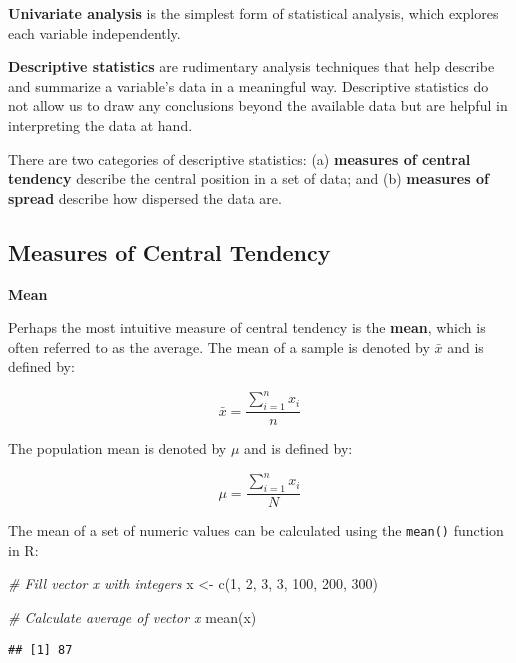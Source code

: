 \documentclass[
]{book}
\newenvironment{Shaded}{\begin{snugshade}}{\end{snugshade}}
\newcommand{\CommentTok}[1]{\textcolor[rgb]{0.56,0.35,0.01}{\textit{#1}}}
\newcommand{\DecValTok}[1]{\textcolor[rgb]{0.00,0.00,0.81}{#1}}
\newcommand{\FunctionTok}[1]{\textcolor[rgb]{0.00,0.00,0.00}{#1}}
\newcommand{\NormalTok}[1]{#1}
\newcommand{\OtherTok}[1]{\textcolor[rgb]{0.56,0.35,0.01}{#1}}
\begin{document}
\textbf{Univariate analysis} is the simplest form of statistical analysis, which explores each variable independently.

\textbf{Descriptive statistics} are rudimentary analysis techniques that help describe and summarize a variable's data in a meaningful way. Descriptive statistics do not allow us to draw any conclusions beyond the available data but are helpful in interpreting the data at hand.

There are two categories of descriptive statistics: (a) \textbf{measures of central tendency} describe the central position in a set of data; and (b) \textbf{measures of spread} describe how dispersed the data are.

\hypertarget{measures-of-central-tendency}{%
\subsection{Measures of Central Tendency}\label{measures-of-central-tendency}}

\textbf{Mean}

Perhaps the most intuitive measure of central tendency is the \textbf{mean}, which is often referred to as the average. The mean of a sample is denoted by \(\bar{x}\) and is defined by:

\[ \bar{x} = \frac{\displaystyle\sum_{i=1}^{n} x_{i}}{n} \]

The population mean is denoted by \(\mu\) and is defined by:

\[ \mu = \frac{\displaystyle\sum_{i=1}^{n} x_{i}}{N} \]

The mean of a set of numeric values can be calculated using the \texttt{mean()} function in R:

\begin{Shaded}
\begin{Highlighting}[]
\CommentTok{\# Fill vector x with integers}
\NormalTok{x }\OtherTok{\textless{}{-}} \FunctionTok{c}\NormalTok{(}\DecValTok{1}\NormalTok{, }\DecValTok{2}\NormalTok{, }\DecValTok{3}\NormalTok{, }\DecValTok{3}\NormalTok{, }\DecValTok{100}\NormalTok{, }\DecValTok{200}\NormalTok{, }\DecValTok{300}\NormalTok{)}

\CommentTok{\# Calculate average of vector x}
\FunctionTok{mean}\NormalTok{(x)}
\end{Highlighting}
\end{Shaded}

\begin{verbatim}
## [1] 87
\end{verbatim}
\end{document}
